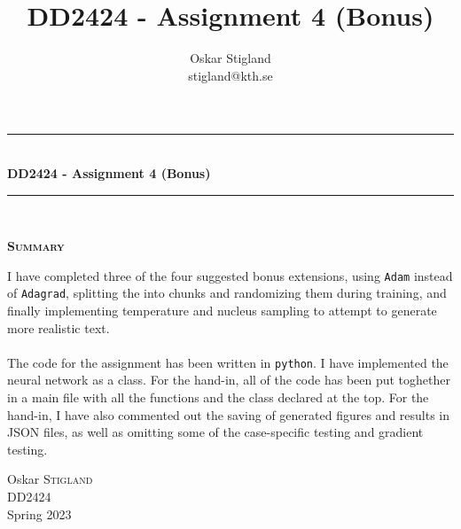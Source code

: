 \documentclass{article}
\title{DD2424 - Assignment 4 (Bonus)}
\author{Oskar Stigland \\ stigland@kth.se}
\begin{document}

	\begin{titlepage}
		\begin{center} 
			
			\rule{\linewidth}{0.5mm}\\[0.5 cm]
			{ \huge \bfseries DD2424 - Assignment 4 (Bonus)}\\[0.3 cm] %
			\rule{\linewidth}{0.5mm}\\[1 cm]
					
			\small\vfill
			\begin{center}
			\centering
			{\large \bfseries \textsc{Summary}}\\
			\vspace{1cm}
			\begin{minipage}{10cm}
				
				I have completed three of the four suggested bonus extensions, using \texttt{Adam} instead of \texttt{Adagrad}, splitting the into chunks and randomizing them during training, and finally implementing temperature and nucleus sampling to attempt to generate more realistic text.\\\\
%
	The code for the assignment has been written in \texttt{python}. I have implemented the neural network as a class. For the hand-in, all of the code has been put toghether in a main file with all the functions and the class declared at the top. For the hand-in, I have also commented out the saving of generated figures and results in JSON files, as well as omitting some of the case-specific testing and gradient testing.
			\end{minipage}
			\end{center}
			\large\vfill
						

		\end{center}	
		
		\begin{minipage}{0.4\textwidth}
			\begin{flushleft} \large
				Oskar \textsc{Stigland}\\
				DD2424\\
				Spring 2023
			\end{flushleft}
		\end{minipage}	

	\end{titlepage}
\end{document}

